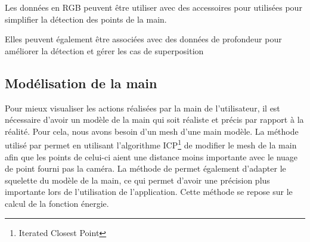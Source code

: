 \documentclass{article}
\begin{document}
Les données en RGB peuvent être utiliser avec des accessoires pour utilisées pour simplifier la détection des points de la main. \cite{wang2009real} 

Elles peuvent également être associées avec des données de profondeur pour améliorer la détection et gérer les cas de superposition \cite{van2011combining}

\subsection{Modélisation de la main}
Pour mieux visualiser les actions réalisées par la main de l'utilisateur, il est nécessaire d'avoir
un modèle de la main qui soit réaliste et précis par rapport à la réalité. Pour cela, nous avons besoin d'un
mesh d'une main modèle. La méthode utilisé par \cite{export:217428} permet en utilisant l'algorithme
ICP\footnote{Iterated Closest Point} \cite{zhang:inria-00074899} de modifier le mesh de la main afin
que les points de celui-ci aient une distance moins importante avec le nuage de point fourni pas la 
caméra. La méthode de \cite{export:217428} permet également d'adapter le squelette du modèle de la 
main, ce qui permet d'avoir une précision plus importante lors de l'utilisation de l'application.
Cette méthode se repose sur le calcul de la fonction énergie.

\end{document}
